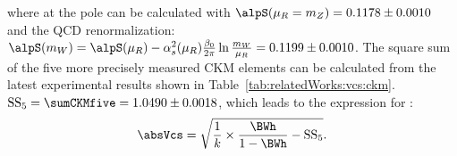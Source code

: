 \noindent where \alpS at the \PW pole can be calculated with $\alpS(\mu_R = m_Z)=0.1178\pm0.0010$~\cite{pdg2020} and the QCD renormalization: $\alpS(m_W) = \alpS(\mu_R) - \alpha^2_s(\mu_R) \frac{ \beta_0}{2\pi} \ln \frac{m_W}{\mu_R} = 0.1199 \pm 0.0010$. The square sum of the five more precisely measured CKM elements can be calculated from the latest experimental results \cite{pdg2020} shown in Table~\ref{tab:relatedWorks:vcs:ckm}. $\mathrm{SS_5} = \sumCKMfive = 1.0490 \pm 0.0018$, which leads to the expression for \absVcs:
\begin{equation}
\absVcs = \sqrt{ \frac{1}{k}\times \frac{\BWh }{1- \BWh} - \mathrm{SS_5} } .
\end{equation}






